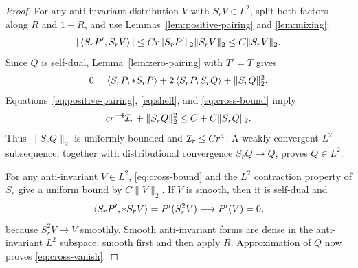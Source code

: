\begin{proof}
For any anti-invariant distribution \(V\) with \(S_rV\in L^2\),
split both factors along \(R\) and \(1-R\), and use
Lemmas~\ref{lem:positive-pairing} and \ref{lem:mixing}:
\begin{equation}\label{eq:cross-bound}
|\left\langle S_rP',S_rV\right\rangle|
\le Cr\|S_rP'\|_2\|S_rV\|_2
\le C\|S_rV\|_2.
\end{equation}
Since \(Q\) is self-dual, Lemma~\ref{lem:zero-pairing} with
\(T'=T\) gives
\[
0=\left\langle S_rP,*S_rP\right\rangle
+2\left\langle S_rP,S_rQ\right\rangle+\|S_rQ\|_2^2.
\]
Equations~\eqref{eq:positive-pairing}, \eqref{eq:shell},
and \eqref{eq:cross-bound} imply
\[
cr^{-4}\mathcal I_r+\|S_rQ\|_2^2
\le C+C\|S_rQ\|_2.
\]
Thus \(\|S_rQ\|_2\) is uniformly bounded and
\(\mathcal I_r\le Cr^4\). A weakly convergent \(L^2\) subsequence,
together with distributional convergence \(S_rQ\to Q\),
proves \(Q\in L^2\).

For any anti-invariant \(V\in L^2\),
\eqref{eq:cross-bound} and the \(L^2\) contraction property
of \(S_r\) give a uniform bound by \(C\|V\|_2\).
If \(V\) is smooth, then it is self-dual and
\[
\left\langle S_rP',*S_rV\right\rangle=P'(S_r^2V)\longrightarrow P'(V)=0,
\]
because \(S_r^2V\to V\) smoothly. Smooth anti-invariant
forms are dense in the anti-invariant \(L^2\) subspace:
smooth first and then apply \(R\).
Approximation of \(Q\) now proves \eqref{eq:cross-vanish}.
\end{proof}
